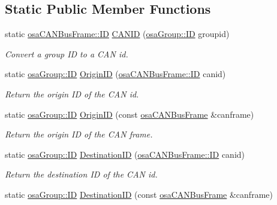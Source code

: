 \subsection*{Static Public Member Functions}
\begin{DoxyCompactItemize}
\item 
static \hyperlink{classosa_c_a_n_bus_frame_ae917bcfe6427b2055a405716909c6048}{osa\-C\-A\-N\-Bus\-Frame\-::\-I\-D} \hyperlink{classosa_group_a332607860406b46ce4b1643ffa243fdd}{C\-A\-N\-I\-D} (\hyperlink{classosa_group_a642da327f9e3c40d46293432b949f199}{osa\-Group\-::\-I\-D} groupid)
\begin{DoxyCompactList}\small\item\em Convert a group I\-D to a C\-A\-N id. \end{DoxyCompactList}\item 
static \hyperlink{classosa_group_a642da327f9e3c40d46293432b949f199}{osa\-Group\-::\-I\-D} \hyperlink{classosa_group_a292f6b5dbb394ca983a86b051029f0d8}{Origin\-I\-D} (\hyperlink{classosa_c_a_n_bus_frame_ae917bcfe6427b2055a405716909c6048}{osa\-C\-A\-N\-Bus\-Frame\-::\-I\-D} canid)
\begin{DoxyCompactList}\small\item\em Return the origin I\-D of the C\-A\-N id. \end{DoxyCompactList}\item 
static \hyperlink{classosa_group_a642da327f9e3c40d46293432b949f199}{osa\-Group\-::\-I\-D} \hyperlink{classosa_group_afe8c7c42b72a0ed95915a1fb91e705b8}{Origin\-I\-D} (const \hyperlink{classosa_c_a_n_bus_frame}{osa\-C\-A\-N\-Bus\-Frame} \&canframe)
\begin{DoxyCompactList}\small\item\em Return the origin I\-D of the C\-A\-N frame. \end{DoxyCompactList}\item 
static \hyperlink{classosa_group_a642da327f9e3c40d46293432b949f199}{osa\-Group\-::\-I\-D} \hyperlink{classosa_group_a35e576c3f6070b42ed376e53b1c57c4a}{Destination\-I\-D} (\hyperlink{classosa_c_a_n_bus_frame_ae917bcfe6427b2055a405716909c6048}{osa\-C\-A\-N\-Bus\-Frame\-::\-I\-D} canid)
\begin{DoxyCompactList}\small\item\em Return the destination I\-D of the C\-A\-N id. \end{DoxyCompactList}\item 
static \hyperlink{classosa_group_a642da327f9e3c40d46293432b949f199}{osa\-Group\-::\-I\-D} \hyperlink{classosa_group_ae58af2b24319bd8e046b5b83c1c7eab5}{Destination\-I\-D} (const \hyperlink{classosa_c_a_n_bus_frame}{osa\-C\-A\-N\-Bus\-Frame} \&canframe)

\end{DoxyCompactItemize}
